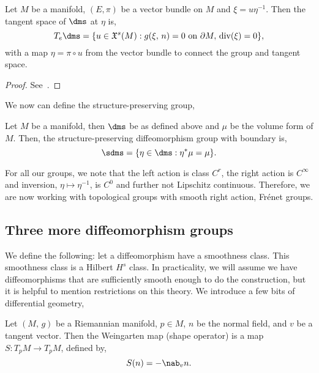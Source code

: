 \begin{nlemma}
  Let $M$ be a manifold, $(E, \pi)$ be a vector bundle on $M$ and $\xi = u\eta^{-1}$. Then the tangent space of $\dms$ at $\eta$ is,
  $$ T_e\dms = \{u \in \mathfrak{X}^s(M) : g(\xi,\, n) = 0 \text{ on }\partial M,\, \mathrm{div}(\xi) = 0\}, $$
  with a map $\eta = \pi \circ u$ from the vector bundle to connect the group and tangent space.
\end{nlemma}
\begin{proof}
  See~\cite{diffeost}.
\end{proof}

\noindent
We now can define the structure-preserving group,
\begin{ndefi}
  Let $M$ be a manifold, then $\dms$ be as defined above and $\mu$ be the volume form of $M$. Then, the structure-preserving diffeomorphism group with boundary is,
  $$ \sdms = \{\eta \in \dms : \eta^* \mu = \mu \}. $$
\end{ndefi}
\noindent
For all our groups, we note that the left action is class $C^r$, the right action is $C^\infty$ and inversion, $\eta \mapsto \eta^{-1}$, is $C^0$ and further not Lipschitz continuous. Therefore, we are now working with topological groups with smooth right action, Fr\'enet groups.

\noindent
\subsection{Three more diffeomorphism groups}
We define the following: let a diffeomorphism have a smoothness class. This smoothness class is a Hilbert $ H^s$ class. In practicality, we will assume we have diffeomorphisms that are sufficiently smooth enough to do the construction, but it is helpful to mention restrictions on this theory. We introduce a few bits of differential geometry,
\begin{ndefi}
  Let $(M,\, g)$ be a Riemannian manifold, $p \in M$, $n$ be the normal field, and $v$ be a tangent vector. Then the Weingarten map (shape operator) is a map $S: T_pM \to T_pM$, defined by,
  $$ S(n) = -\nab_v n. $$
\end{ndefi}

